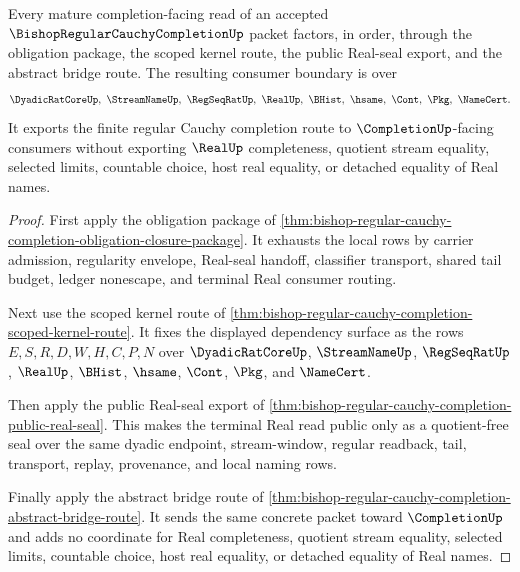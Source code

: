 \begin{theorem}
\label{thm:bishop-regular-cauchy-completion-mature-route}
Every mature completion-facing read of an accepted $\BishopRegularCauchyCompletionUp$ packet factors, in order, through the obligation package, the scoped kernel route, the public Real-seal export, and the abstract bridge route. The resulting consumer boundary is over
$$
\DyadicRatCoreUp,\ \StreamNameUp,\ \RegSeqRatUp,\ \RealUp,\ \BHist,\ \hsame,\ \Cont,\ \Pkg,\ \NameCert .
$$
It exports the finite regular Cauchy completion route to $\CompletionUp$-facing consumers without exporting $\RealUp$ completeness, quotient stream equality, selected limits, countable choice, host real equality, or detached equality of Real names.
\end{theorem}
\begin{proof}
First apply the obligation package of \autoref{thm:bishop-regular-cauchy-completion-obligation-closure-package}. It exhausts the local rows by carrier admission, regularity envelope, Real-seal handoff, classifier transport, shared tail budget, ledger nonescape, and terminal Real consumer routing.

Next use the scoped kernel route of \autoref{thm:bishop-regular-cauchy-completion-scoped-kernel-route}. It fixes the displayed dependency surface as the rows $E,S,R,D,W,H,C,P,N$ over $\DyadicRatCoreUp$, $\StreamNameUp$, $\RegSeqRatUp$, $\RealUp$, $\BHist$, $\hsame$, $\Cont$, $\Pkg$, and $\NameCert$.

Then apply the public Real-seal export of \autoref{thm:bishop-regular-cauchy-completion-public-real-seal}. This makes the terminal Real read public only as a quotient-free seal over the same dyadic endpoint, stream-window, regular readback, tail, transport, replay, provenance, and local naming rows.

Finally apply the abstract bridge route of \autoref{thm:bishop-regular-cauchy-completion-abstract-bridge-route}. It sends the same concrete packet toward $\CompletionUp$ and adds no coordinate for Real completeness, quotient stream equality, selected limits, countable choice, host real equality, or detached equality of Real names.
\end{proof}

